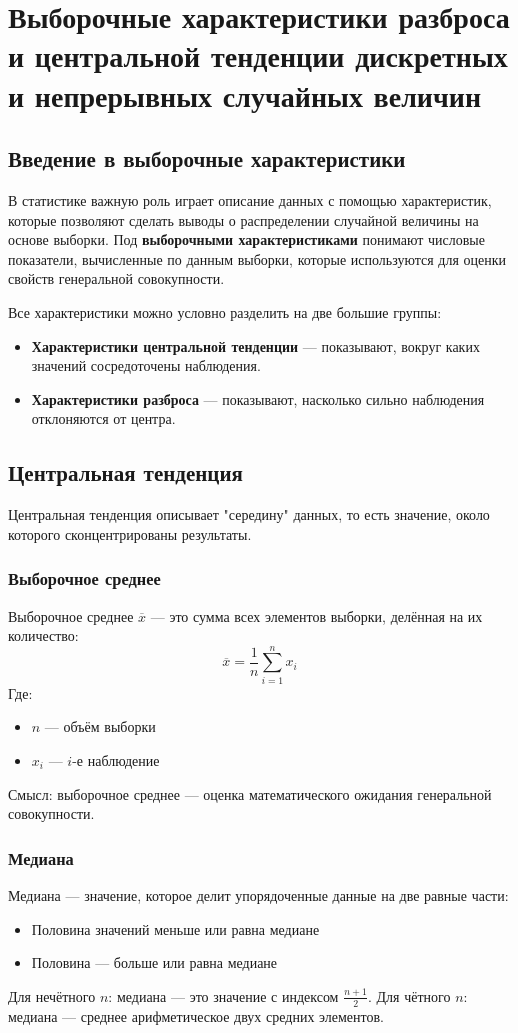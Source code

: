 \section{Выборочные характеристики разброса и центральной тенденции дискретных и непрерывных случайных величин}

\subsection{Введение в выборочные характеристики}
В статистике важную роль играет описание данных с помощью характеристик, которые позволяют сделать выводы о распределении случайной величины на основе выборки.  
Под \textbf{выборочными характеристиками} понимают числовые показатели, вычисленные по данным выборки, которые используются для оценки свойств генеральной совокупности.  

Все характеристики можно условно разделить на две большие группы:
\begin{itemize}
    \item \textbf{Характеристики центральной тенденции} — показывают, вокруг каких значений сосредоточены наблюдения.
    \item \textbf{Характеристики разброса} — показывают, насколько сильно наблюдения отклоняются от центра.
\end{itemize}

\subsection{Центральная тенденция}
Центральная тенденция описывает "середину" данных, то есть значение, около которого сконцентрированы результаты.

\subsubsection{Выборочное среднее}
Выборочное среднее $\overline{x}$ — это сумма всех элементов выборки, делённая на их количество:
\[
\overline{x} = \frac{1}{n} \sum_{i=1}^n x_i
\]
Где:
\begin{itemize}
    \item $n$ — объём выборки
    \item $x_i$ — $i$-е наблюдение
\end{itemize}
Смысл: выборочное среднее — оценка математического ожидания генеральной совокупности.

\subsubsection{Медиана}
Медиана — значение, которое делит упорядоченные данные на две равные части:
\begin{itemize}
    \item Половина значений меньше или равна медиане
    \item Половина — больше или равна медиане
\end{itemize}
Для нечётного $n$: медиана — это значение с индексом $\frac{n+1}{2}$.  
Для чётного $n$: медиана — среднее арифметическое двух средних элементов.

